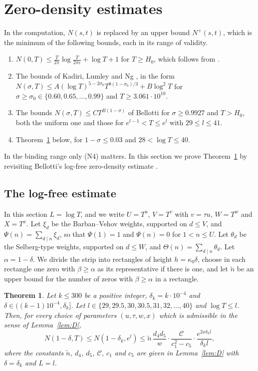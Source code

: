 \documentclass[11pt]{amsart}
\numberwithin{equation}{section}
\newtheorem{theorem}{Theorem}[section]
\theoremstyle{definition}
\theoremstyle{remark}
\begin{document}
\section{Zero-density estimates}\label{sec:density}

In the computation, $N(s,t)$ is replaced by an upper bound $N^+(s,t)$, which is the minimum of the following bounds, each in its range of validity.
\begin{enumerate}
\item[(N1)] $N(0, T) \leq \frac{T}{2\pi}\log\frac{T}{2\pi e} + \log T + 1$ for $T \geq H_0$, which follows from \cite{HSW}.
\item[(N2)] The bounds of Kadiri, Lumley and Ng \cite[Table~1]{KLN}, in the form $N(\sigma, T) \leq A(\log T)^{5 - 2\sigma_0}T^{8(1-\sigma_0)/3} + B\log^2T$ for $\sigma \geq \sigma_0 \in \{0.60, 0.65, \ldots, 0.99\}$ and $T \geq 3.061\cdot10^{10}$.
\item[(N3)] The bounds $N(\sigma, T) \leq CT^{B(1-\sigma)}$ of Bellotti \cite[Theorem~1.1 and Table~2]{Bellotti} for $\sigma \geq 0.9927$ and $T > H_0$, both the uniform one and those for $e^{l-1} < T \leq e^l$ with $29 \leq l \leq 41$.
\item[(N4)] Theorem~\ref{thm:density} below, for $1 - \sigma \leq 0.03$ and $28 < \log T \leq 40$.
\end{enumerate}
In the binding range only (N4) matters.
In this section we prove Theorem~\ref{thm:density} by revisiting Bellotti's log-free zero-density estimate \cite[Sections~3--4]{Bellotti}.

\subsection{The log-free estimate}

In this section $L = \log T$, and we write $U = T^u$, $V = T^v$ with $v = \tau u$, $W = T^w$ and $X = T^x$.
Let $\xi_d$ be the Barban--Vehov weights, supported on $d \leq V$, and $\Psi(n) = \sum_{d\mid n}\xi_d$, so that $\Psi(1) = 1$ and $\Psi(n) = 0$ for $1 < n \leq U$.
Let $\theta_d$ be the Selberg-type weights, supported on $d \leq W$, and $\Theta(n) = \sum_{d\mid n}\theta_d$.
Let $\alpha = 1 - \delta$.
We divide the strip into rectangles of height $h = \kappa_0\delta$, choose in each rectangle one zero with $\beta \geq \alpha$ as its representative if there is one, and let $\tilde n$ be an upper bound for the number of zeros with $\beta \geq \alpha$ in a rectangle.

\begin{theorem}\label{thm:density}
Let $k \leq 300$ be a positive integer, $\delta_k = k\cdot10^{-4}$ and $\delta \in ((k-1)10^{-4}, \delta_k]$.
Let $l \in \{29, 29.5, 30, 30.5, 31, 32, \ldots, 40\}$ and $\log T \leq l$.
Then, for every choice of parameters $(u, \tau, w, x)$ which is admissible in the sense of Lemma~\ref{lem:D},
\[
N(1 - \delta, T) \leq N(1 - \delta_k, e^l) \leq \tilde n\,\frac{d_4d_5}{w}\cdot\frac{\mathcal C}{c_1^2 - c_5}\cdot\frac{e^{2x\delta_kl}}{\delta_kl},
\]
where the constants $\tilde n$, $d_4$, $d_5$, $\mathcal C$, $c_1$ and $c_5$ are given in Lemma~\ref{lem:D} with $\delta = \delta_k$ and $L = l$.
\end{theorem}
\end{document}
